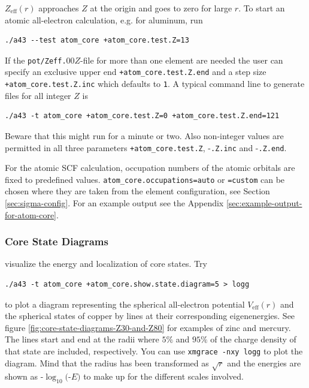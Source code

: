 \documentclass[oribibl]{llncs}
\newcommand{\um}[1]{_{\mathrm{#1}}}
\newcommand{\ttt}[1]{\texttt{#1}}
\begin{document}
\noindent
$Z\um{eff}(r)$ approaches $Z$ at the origin and goes to zero for large $r$.
To start an atomic all-electron calculation, e.g. for aluminum, run
\begin{verbatim}
./a43 --test atom_core +atom_core.test.Z=13
\end{verbatim}
If the \ttt{pot/Zeff.}$00Z$-file for more than one element are needed
the user can specify an exclusive upper end \ttt{+atom\_core.test.Z.end} 
and a step size \ttt{+atom\_core.test.Z.inc} which defaults to \ttt{1}.
A typical command line to generate files for all integer $Z$ is
\begin{verbatim}
./a43 -t atom_core +atom_core.test.Z=0 +atom_core.test.Z.end=121
\end{verbatim}
Beware that this might run for a minute or two.
Also non-integer values are permitted in all three parameters 
\ttt{+atom\_core.test.Z}, -\ttt{.Z.inc} and -\ttt{.Z.end}.
%

\noindent
For the atomic \ac{SCF} calculation, occupation numbers of the atomic orbitals are fixed
to predefined values. \ttt{atom\_core.occupations=auto} or \ttt{=custom} can be chosen
where they are taken from the element configuration, see Section \ref{sec:sigma-config}.
For an example output see the Appendix \ref{sec:example-output-for-atom-core}.

\subsubsection{Core State Diagrams} \label{sec:core-state-diagram}
visualize the energy and localization of core states. Try
\begin{verbatim}
./a43 -t atom_core +atom_core.show.state.diagram=5 > logg
\end{verbatim}
to plot a diagram representing the spherical all-electron potential $V\um{eff}(r)$
and the spherical states of copper by lines at their corresponding eigenenergies.
See figure \ref{fig:core-state-diagrams-Z30-and-Z80} for examples of zinc and mercury.
The lines start and end at the radii where $5\%$ and $95\%$ of the charge density of that state are included, respectively.
You can use \ttt{xmgrace -nxy logg} to plot the diagram.
\noindent
Mind that the radius has been transformed as $\sqrt{r}$
and the energies are shown as -$\log_{10}($-$E)$ to make up for the different scales involved.
\end{document}
